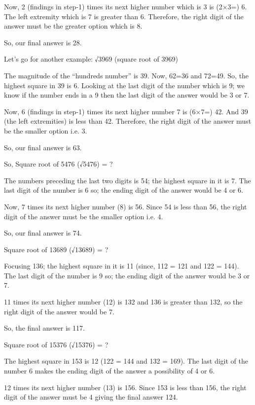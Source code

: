 Now, 2 (findings in step-1) times its next higher number which is 3 is (2×3=) 6. The left extremity which is 7 is greater than 6. Therefore, the right digit of the answer must be the greater option which is 8. 

So, our final answer is 28.

Let’s go for another example: √3969 (square root of 3969)

    The magnitude of the “hundreds number” is 39. Now, 62=36 and 72=49. So, the highest square in 39 is 6.
    Looking at the last digit of the number which is 9; we know if the number ends in a 9 then the last digit of the answer would be 3 or 7.

Now, 6 (findings in step-1) times its next higher number 7 is (6×7=) 42. And 39 (the left extremities) is less than 42. Therefore, the right digit of the answer must be the smaller option i.e. 3.

So, our final answer is 63.

So, Square root of 5476 (√5476) = ?

    The numbers preceding the last two digits is 54; the highest square in it is 7.
    The last digit of the number is 6 so; the ending digit of the answer would be 4 or 6.

Now, 7 times its next higher number (8) is 56. Since 54 is less than 56, the right digit of the answer must be the smaller option i.e. 4.

So, our final answer is 74.

Square root of 13689 (√13689) = ?

    Focusing 136; the highest square in it is 11 (since, 112 = 121 and 122 = 144).
    The last digit of the number is 9 so; the ending digit of the answer would be 3 or 7.

11 times its next higher number (12) is 132 and 136 is greater than 132, so the right digit of the answer would be 7.

So, the final answer is 117.

Square root of 15376 (√15376) = ?

    The highest square in 153 is 12 (122 = 144 and 132 = 169).
    The last digit of the number 6 makes the ending digit of the answer a possibility of 4 or 6.

12 times its next higher number (13) is 156. Since 153 is less than 156, the right digit of the answer must be 4 giving the final answer 124.
